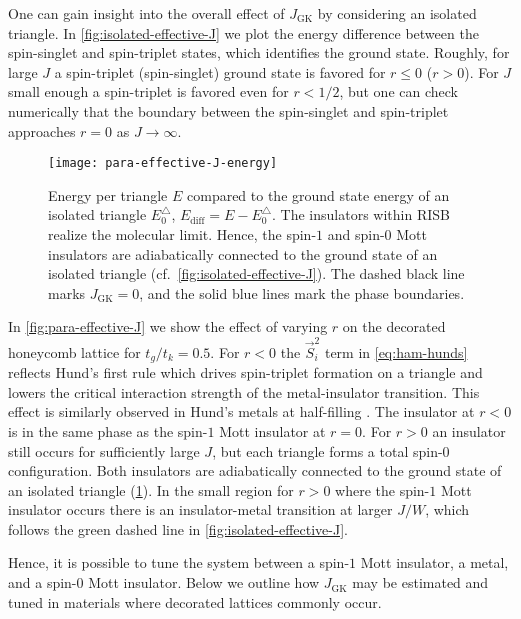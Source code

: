 \documentclass[reprint,aps,prb,amsmath,amssymb]{revtex4-2}
\begin{document}
One can gain insight into the overall effect of $J_{\mathrm{GK}}$ by considering an isolated triangle. In \cref{fig:isolated-effective-J} we plot the energy difference between the spin-singlet and spin-triplet states, which identifies the ground state. Roughly, for large $J$ a spin-triplet (spin-singlet) ground state is favored for $r \le 0$ ($r > 0$). For $J$ small enough a spin-triplet is favored even for $r < 1/2$, but one can check numerically that the boundary between the spin-singlet and spin-triplet approaches $r = 0$ as $J \rightarrow \infty$.

\begin{figure}
\centering
\texttt{[image: para-effective-J-energy]}
\caption{\label{fig:para-effective-J-energy}
	Energy per triangle $E$ compared to the ground state energy of an isolated triangle $E_0^{\triangle}$, $E_{\mathrm{diff}} = E - E_0^{\triangle}$. The insulators within RISB realize the molecular limit. Hence, the spin-$1$ and spin-$0$ Mott insulators are adiabatically connected to the ground state of an isolated triangle (cf.~\cref{fig:isolated-effective-J}).
	The dashed black line marks $J_{\mathrm{GK}} = 0$, and the solid blue lines mark the phase boundaries.
}
\end{figure}

In \cref{fig:para-effective-J} we show the effect of varying $r$ on the decorated honeycomb lattice for $t_g/t_k = 0.5$. For $r < 0 $ the $\vec{S}_i^2$ term in \cref{eq:ham-hunds} reflects Hund's first rule which drives spin-triplet formation on a triangle and lowers the critical interaction strength of the metal-insulator transition. This effect is similarly observed in Hund's metals at half-filling \cite{Lechermann2007, Georges2013}. The insulator at $r < 0$ is in the same phase as the spin-$1$ Mott insulator at $r = 0$. For $r > 0$ an insulator still occurs for sufficiently large $J$, but each triangle forms a total spin-$0$ configuration. Both insulators are adiabatically connected to the ground state of an isolated triangle (\cref{fig:para-effective-J-energy}). In the small region for $r > 0$ where the spin-$1$ Mott insulator occurs there is an insulator-metal transition at larger $J/W$, which follows the green dashed line in \cref{fig:isolated-effective-J}.

Hence, it is possible to tune the system between a spin-$1$ Mott insulator, a metal, and a spin-$0$ Mott insulator. Below we outline how $J_{\mathrm{GK}}$ may be estimated and tuned in materials where decorated lattices commonly occur.
\end{document}
